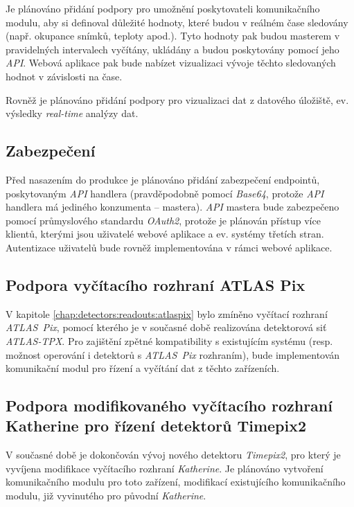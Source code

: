 Je plánováno přidání podpory pro umožnění poskytovateli komunikačního modulu, aby si definoval důležité hodnoty, které budou v reálném čase sledovány (např. okupance snímků, teploty apod.). Tyto hodnoty pak budou masterem v pravidelných intervalech vyčítány, ukládány a budou poskytovány pomocí jeho \textit{API}. Webová aplikace pak bude nabízet vizualizaci vývoje těchto sledovaných hodnot v závislosti na čase.

Rovněž je plánováno přidání podpory pro vizualizaci dat z datového úložiště, ev. výsledky \textit{real-time} analýzy dat.

\subsection{Zabezpečení}
Před nasazením do produkce je plánováno přidání zabezpečení endpointů, poskytovaným \textit{API} handlera (pravděpodobně pomocí \textit{Base64}, protože \textit{API} handlera má jediného konzumenta -- mastera). \textit{API} mastera bude zabezpečeno pomocí průmyslového standardu \textit{OAuth2}, protože je plánován přístup více klientů, kterými jsou uživatelé webové aplikace a ev. systémy třetích stran. Autentizace uživatelů bude rovněž implementována v rámci webové aplikace.

\subsection{Podpora vyčítacího rozhraní ATLAS Pix}
V kapitole \ref{chap:detectors:readouts:atlaspix} bylo zmíněno vyčítací rozhraní \textit{ATLAS~Pix}, pomocí kterého je v současné době realizována detektorová siť \textit{ATLAS-TPX}. Pro zajištění zpětné kompatibility s existujícím systému (resp. možnost operování i detektorů s \textit{ATLAS~Pix} rozhraním), bude implementován komunikační modul pro řízení a vyčítání dat z těchto zařízeních.

\subsection{Podpora modifikovaného vyčítacího rozhraní Katherine pro řízení detektorů Timepix2}
V současné době je dokončován vývoj nového detektoru \textit{Timepix2}, pro který je vyvíjena modifikace vyčítacího rozhraní \textit{Katherine}. Je plánováno vytvoření komunikačního modulu pro toto zařízení, modifikací existujícího komunikačního modulu, již vyvinutého pro původní \textit{Katherine}.